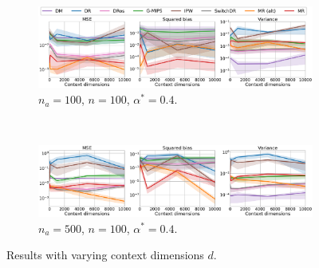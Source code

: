  \begin{figure}[ht]
     \centering
    \begin{subfigure}[b]{0.8\textwidth}
         \centering
         \includegraphics[width=\textwidth]{figures/mr/all_baselines/ope_vs_dimc_nac_100_alphatar_0.4_neval_100_ntrain_100000.png}
         \caption{$n_{a}=100$, $n = 100$, $\alpha^\ast = 0.4$.}
         \label{fig:mse-vs-d-conf2a}
     \end{subfigure}\\
     \begin{subfigure}[b]{0.8\textwidth}
         \centering
         \includegraphics[width=\textwidth]{figures/mr/all_baselines/ope_vs_dimc_nac_500_neval_100_alphatar_0_2_ntrain_100000.png}
         \caption{$n_{a}=500$, $n = 100$, $\alpha^\ast = 0.4$.}
         \label{fig:mse-vs-d-conf2b}
     \end{subfigure}
     \caption{Results with varying context dimensions $d$.}
     \label{fig:mse-vs-d-conf2}
 \end{figure}

